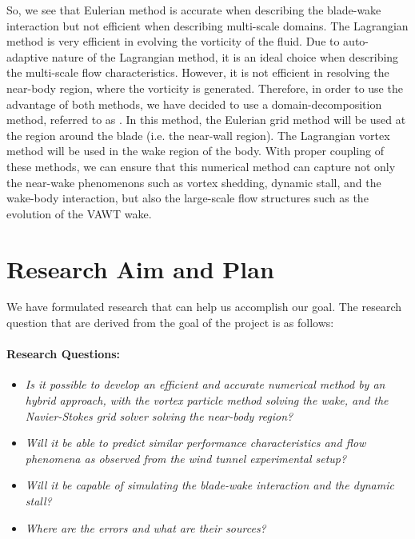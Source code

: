 So, we see that Eulerian method is accurate when describing the blade-wake interaction but not efficient when describing multi-scale domains. The Lagrangian method is very efficient in evolving the vorticity of the fluid. Due to auto-adaptive nature of the Lagrangian method, it is an ideal choice when describing the multi-scale flow characteristics. However, it is not efficient in resolving the near-body region, where the vorticity is generated. Therefore, in order to use the advantage of both methods, we have decided to use a domain-decomposition method, referred to as . In this method, the Eulerian grid method will be used at the region around the blade (i.e. the near-wall region). The Lagrangian vortex method will be used in the wake region of the body. With proper coupling of these methods, we can ensure that this numerical method can capture not only the near-wake phenomenons such as vortex shedding, dynamic stall, and the wake-body interaction, but also the large-scale flow structures such as the evolution of the VAWT wake.

\section{Research Aim and Plan}

We have formulated research that can help us accomplish our goal. The research question that are derived from the goal of the project is as follows:

\paragraph*{Research Questions:}
	\begin{itemize}
	\item \textit{Is it possible to develop an efficient and accurate numerical method by an
	hybrid approach, with the vortex particle method solving the wake, and the Navier-Stokes grid solver solving the near-body region?}
	
	\item \textit{Will it be able to predict similar performance characteristics and flow phenomena as observed from the wind tunnel experimental setup?}
	
	\item \textit{Will it be capable of simulating the blade-wake interaction and the dynamic stall?}
	
	\item \textit{Where are the errors and what are their sources?}
	\end{itemize}

